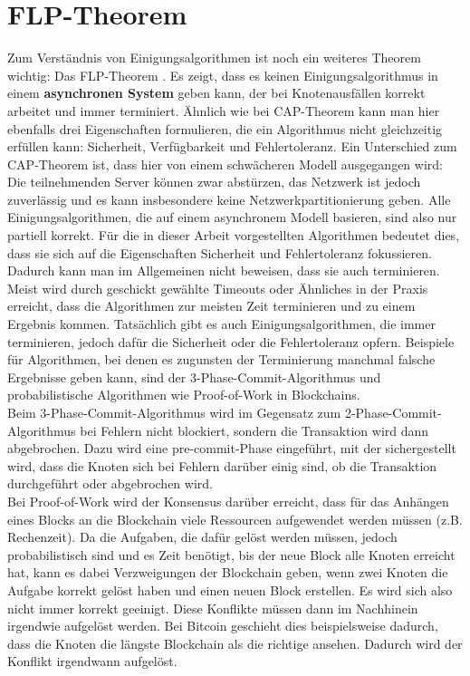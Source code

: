 \section{FLP-Theorem}

Zum Verständnis von Einigungsalgorithmen ist noch ein weiteres Theorem wichtig: Das FLP-Theorem \cite{flp}. Es zeigt, dass es keinen Einigungsalgorithmus in einem \textbf{asynchronen System} geben kann, der bei Knotenausfällen korrekt arbeitet und immer terminiert. Ähnlich wie bei CAP-Theorem kann man hier ebenfalls drei Eigenschaften formulieren, die ein Algorithmus nicht gleichzeitig erfüllen kann: Sicherheit, Verfügbarkeit und Fehlertoleranz. Ein Unterschied zum CAP-Theorem ist, dass hier von einem schwächeren Modell ausgegangen wird: Die teilnehmenden Server können zwar abstürzen, das Netzwerk ist jedoch zuverlässig und es kann insbesondere keine Netzwerkpartitionierung geben.
Alle Einigungsalgorithmen, die auf einem asynchronem Modell basieren, sind also nur partiell korrekt. Für die in dieser Arbeit vorgestellten Algorithmen bedeutet dies, dass sie sich auf die Eigenschaften Sicherheit und Fehlertoleranz fokussieren. Dadurch kann man im Allgemeinen nicht beweisen, dass sie auch terminieren. Meist wird durch geschickt gewählte Timeouts oder Ähnliches in der Praxis erreicht, dass die Algorithmen zur meisten Zeit terminieren und zu einem Ergebnis kommen.
Tatsächlich gibt es auch Einigungsalgorithmen, die immer terminieren, jedoch dafür die Sicherheit oder die Fehlertoleranz opfern. Beispiele für Algorithmen, bei denen es zugunsten der Terminierung manchmal falsche Ergebnisse geben kann, sind der 3-Phase-Commit-Algorithmus \cite{pc} und probabilistische Algorithmen wie Proof-of-Work in Blockchains. \\
Beim 3-Phase-Commit-Algorithmus wird im Gegensatz zum 2-Phase-Commit-Algorithmus bei Fehlern nicht blockiert, sondern die Transaktion wird dann abgebrochen. Dazu wird eine \glqq pre-commit\grqq-Phase eingeführt, mit der sichergestellt wird, dass die Knoten sich bei Fehlern darüber einig sind, ob die Transaktion durchgeführt oder abgebrochen wird. \\
Bei Proof-of-Work wird der Konsensus darüber erreicht, dass für das Anhängen eines Blocks an die Blockchain viele Ressourcen aufgewendet werden müssen (z.B. Rechenzeit).  Da die Aufgaben, die dafür gelöst werden müssen, jedoch probabilistisch sind und es Zeit benötigt, bis der neue Block alle Knoten erreicht hat, kann es dabei Verzweigungen der Blockchain geben, wenn zwei Knoten die Aufgabe korrekt gelöst haben und einen neuen Block erstellen. Es wird sich also nicht immer korrekt geeinigt. Diese Konflikte müssen dann im Nachhinein irgendwie aufgelöst werden. Bei Bitcoin \cite{bitcoin} geschieht dies beispielsweise dadurch, dass die Knoten die längste Blockchain als die \glqq richtige\grqq{} ansehen. Dadurch wird der Konflikt irgendwann aufgelöst.


